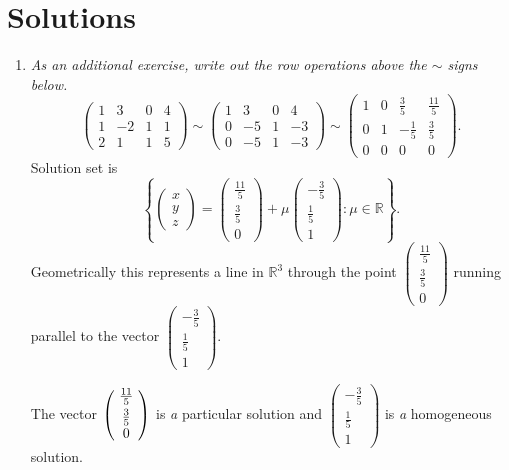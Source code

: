 \section*{Solutions}

\begin{enumerate}
\item
{\itshape As an additional exercise, write out the row operations above the $\sim$ signs below.}
\[
\left(\begin{array}{rrr|r}
1&3&0&4\\[1mm]1&-2&1&1\\[1mm]2&1&1&5
\end{array}\right)
\sim
\left(\begin{array}{rrr|r}
1&3&0&4\\[1mm]0&-5&1&-3\\[1mm]0&-5&1&-3
\end{array}\right)
\sim
\left(\begin{array}{rrr|r}
1&0&\frac35&\frac{11}{5}\\[1mm]0&1&-\frac15&\frac35\\[1mm]0&0&0&0
\end{array}\right).
\]
Solution set is 
\[
\left\{\begin{pmatrix}x\\y\\ z\end{pmatrix}=\begin{pmatrix}\frac{11}5\\[1mm] \frac35\\ 0\end{pmatrix}+\mu
\begin{pmatrix}-\frac35\\\frac15\\1\end{pmatrix}\colon \mu \in \mathbb{R}
\right\}.
\]
Geometrically this represents a line in ${\mathbb R}^3$ through the point 
$\begin{pmatrix}\frac{11}5\\[1mm] \frac35\\ 0\end{pmatrix}$ 
running parallel to the vector 
$\begin{pmatrix}-\frac35\\[1mm]\frac15\\[1mm]1\end{pmatrix}$.

The vector 
$\left(\!\begin{array}{c} \frac{11}5\\[1mm] \frac35\\ 0 \end{array}\!\right)$ 
is {\itshape a} particular solution 
and $\begin{pmatrix}-\frac35\\\frac15\\1\end{pmatrix}$
is {\itshape a} homogeneous solution. 


\end{enumerate}
